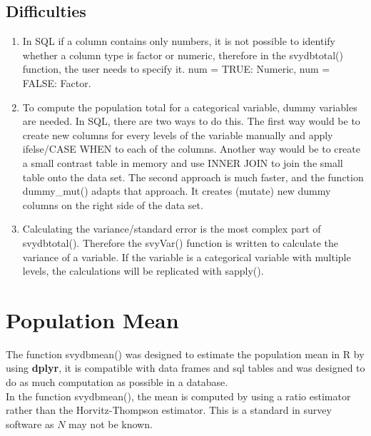 \subsection{Difficulties}
\begin{enumerate}
\item In {\sf SQL} if a column contains only numbers, it is not possible to identify whether a column type is factor or numeric, therefore in the {\ttfamily svydbtotal()} function, the user needs to specify it. {\ttfamily num = TRUE}: Numeric, {\ttfamily num = FALSE}: Factor. \label{tot:d1}

\item To compute the population total for a categorical variable, dummy variables are needed. In {\sf SQL}, there are two ways to do this. The first way would be to create new columns for every levels of the variable manually and apply {\ttfamily ifelse/CASE WHEN} to each of the columns. Another way would be to create a small contrast table in memory and use {\ttfamily INNER JOIN} to join the small table onto the data set. The second approach is much faster, and the function {\ttfamily dummy\_mut()} adapts that approach. It creates (mutate) new dummy columns on the right side of the data set. \label{tot:d2}

\item Calculating the variance/standard error is the most complex part of {\ttfamily svydbtotal()}. Therefore the {\ttfamily svyVar()} function is written to calculate the variance of a variable. If the variable is a categorical variable with multiple levels, the calculations will be replicated with {\ttfamily sapply()}. \label{tot:d3}
\end{enumerate}

\newpage
\section{Population Mean}
The function {\ttfamily svydbmean()} was designed to estimate the population mean in {\sf R} by using {\bf dplyr}, it is compatible with data frames and sql tables and was designed to do as much computation as possible in a database.\\

In the function {\ttfamily svydbmean()}, the mean is computed by using a ratio estimator rather than the  Horvitz-Thompson estimator. This is a standard in survey software as $N$ may not be known.

